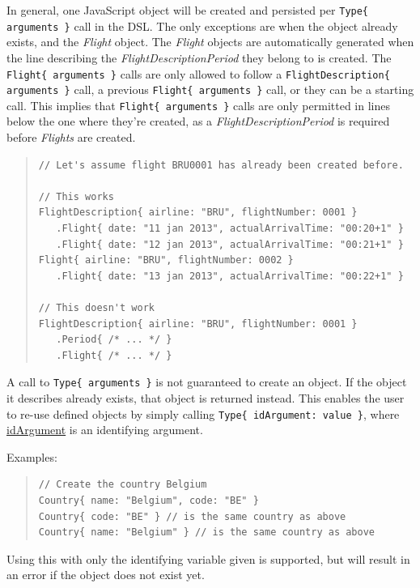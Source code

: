 \documentclass[a4paper,11pt]{article}
\newcommand{\spar}{\par \noindent}
\newcommand{\dslcode}[1]{\texttt{#1}}
\newcommand{\dsltype}[1]{\textit{#1}}
\newcommand{\dslattr}[1]{\uline{#1}}
\begin{document}
\par In general, one JavaScript object will be created and persisted per \dslcode{Type\{ arguments \}} call in the DSL. The only exceptions are when the object already exists, and the \dsltype{Flight} object. The \dsltype{Flight} objects are automatically generated when the line describing the \dsltype{FlightDescriptionPeriod} they belong to is created.
The \dslcode{Flight\{ arguments \}} calls are only allowed to follow a \dslcode{FlightDescription\{ arguments \}} call, a previous \dslcode{Flight\{ arguments \}} call, or they can be a starting call.
This implies that \dslcode{Flight\{ arguments \}} calls are only permitted in lines below the one where they're created, as a \dsltype{FlightDescriptionPeriod} is required before \dsltype{Flights} are created.

\begin{quote}\begin{verbatim}
// Let's assume flight BRU0001 has already been created before.

// This works
FlightDescription{ airline: "BRU", flightNumber: 0001 }
   .Flight{ date: "11 jan 2013", actualArrivalTime: "00:20+1" }
   .Flight{ date: "12 jan 2013", actualArrivalTime: "00:21+1" }
Flight{ airline: "BRU", flightNumber: 0002 }
   .Flight{ date: "13 jan 2013", actualArrivalTime: "00:22+1" }

// This doesn't work
FlightDescription{ airline: "BRU", flightNumber: 0001 }
   .Period{ /* ... */ }
   .Flight{ /* ... */ }
\end{verbatim}\end{quote}

A call to \dslcode{Type\{ arguments \}} is not guaranteed to create an object. If the object it describes already exists, that object is returned instead. This enables the user to re-use defined objects by simply calling \dslcode{Type\{ idArgument: value \}}, where \dslattr{idArgument} is an identifying argument.

\spar Examples:
\begin{quote}\begin{verbatim}
// Create the country Belgium
Country{ name: "Belgium", code: "BE" }
Country{ code: "BE" } // is the same country as above
Country{ name: "Belgium" } // is the same country as above
\end{verbatim}\end{quote}

Using this with only the identifying variable given is supported, but will result in an error if the object does not exist yet.
\end{document}
